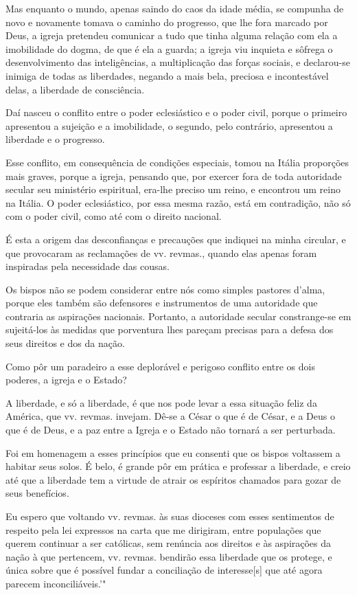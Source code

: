 Mas enquanto o mundo, apenas saindo do caos da idade média, se compunha
de novo e novamente tomava o caminho do progresso, que lhe fora marcado
por Deus, a igreja pretendeu comunicar a tudo que tinha alguma relação
com ela a imobilidade do dogma, de que é ela a guarda; a igreja viu
inquieta e sôfrega o desenvolvimento das inteligências, a multiplicação
das forças sociais, e declarou-se inimiga de todas as liberdades,
negando a mais bela, preciosa e incontestável delas, a liberdade de
consciência.

Daí nasceu o conflito entre o poder eclesiástico e o poder civil, porque
o primeiro apresentou a sujeição e a imobilidade, o segundo, pelo
contrário, apresentou a liberdade e o progresso.

Esse conflito, em consequência de condições especiais, tomou na Itália
proporções mais graves, porque a igreja, pensando que, por exercer fora
de toda autoridade secular seu ministério espiritual, era-lhe preciso um
reino, e encontrou um reino na Itália. O poder eclesiástico, por essa
mesma razão, está em contradição, não só com o poder civil, como até com
o direito nacional.

É esta a origem das desconfianças e precauções que indiquei na minha
circular, e que provocaram as reclamações de vv. revmas., quando elas
apenas foram inspiradas pela necessidade das cousas.

Os bispos não se podem considerar entre nós como simples pastores
d'alma, porque eles também são defensores e instrumentos de uma
autoridade que contraria as aspirações nacionais. Portanto, a autoridade
secular constrange-se em sujeitá-los às medidas que porventura lhes
pareçam precisas para a defesa dos seus direitos e dos da nação.

Como pôr um paradeiro a esse deplorável e perigoso conflito entre os
dois poderes, a igreja e o Estado?

A liberdade, e só a liberdade, é que nos pode levar a essa situação
feliz da América, que vv. revmas. invejam. Dê-se a César o que é de
César, e a Deus o que é de Deus, e a paz entre a Igreja e o Estado não
tornará a ser perturbada.

Foi em homenagem a esses princípios que eu consenti que os bispos
voltassem a habitar seus solos. É belo, é grande pôr em prática e
professar a liberdade, e creio até que a liberdade tem a virtude de
atrair os espíritos chamados para gozar de seus benefícios.

Eu espero que voltando vv. revmas. às suas dioceses com esses
sentimentos de respeito pela lei expressos na carta que me dirigiram,
entre populações que querem continuar a ser católicas, sem renúncia aos
direitos e às aspirações da nação à que pertencem, vv. revmas. bendirão
essa liberdade que os protege, e única sobre que é possível fundar a
conciliação de interesse{[}s{]} que até agora parecem inconciliáveis.'"

